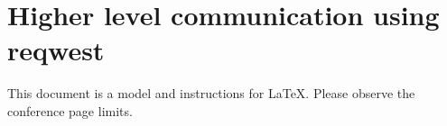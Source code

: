 
\section{Higher level communication using reqwest}
This document is a model and instructions for LaTeX.
Please observe the conference page limits.
